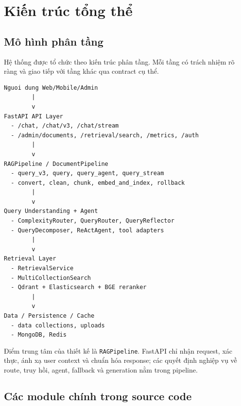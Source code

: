 \documentclass[../DoAn.tex]{subfiles}
\begin{document}
\section{Kiến trúc tổng thể}

\subsection{Mô hình phân tầng}

Hệ thống được tổ chức theo kiến trúc phân tầng. Mỗi tầng có trách nhiệm rõ ràng
và giao tiếp với tầng khác qua contract cụ thể.

\begin{verbatim}
Nguoi dung Web/Mobile/Admin
        |
        v
FastAPI API Layer
  - /chat, /chat/v3, /chat/stream
  - /admin/documents, /retrieval/search, /metrics, /auth
        |
        v
RAGPipeline / DocumentPipeline
  - query_v3, query, query_agent, query_stream
  - convert, clean, chunk, embed_and_index, rollback
        |
        v
Query Understanding + Agent
  - ComplexityRouter, QueryRouter, QueryReflector
  - QueryDecomposer, ReActAgent, tool adapters
        |
        v
Retrieval Layer
  - RetrievalService
  - MultiCollectionSearch
  - Qdrant + Elasticsearch + BGE reranker
        |
        v
Data / Persistence / Cache
  - data collections, uploads
  - MongoDB, Redis
\end{verbatim}

Điểm trung tâm của thiết kế là \texttt{RAGPipeline}. FastAPI chỉ nhận request,
xác thực, ánh xạ user context và chuẩn hóa response; các quyết định nghiệp vụ
về route, truy hồi, agent, fallback và generation nằm trong pipeline.

\subsection{Các module chính trong source code}
\end{document}
